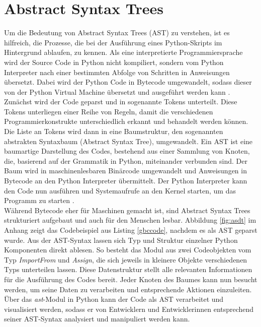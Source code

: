 \documentclass[german,bachelor]{swsLeipzig}
\begin{document}
\section{Abstract Syntax Trees}
Um die Bedeutung von Abstract Syntax Trees (AST) zu verstehen, ist es hilfreich, die Prozesse, die
bei der Ausführung eines Python-Skripts im Hintergrund ablaufen, zu kennen.
Als eine interpretierte Programmiersprache wird der Source Code in Python nicht kompiliert, sondern vom
Python Interpreter nach einer bestimmten Abfolge von Schritten in Anweisungen übersetzt.
Dabei wird der Python Code in Bytecode umgewandelt, sodass dieser von der Python Virtual Machine
übersetzt und ausgeführt werden kann \cite[]{aycock1998compiling}. \\
\indent Zunächst wird der Code geparst und in sogenannte Tokens unterteilt.
Diese Tokens unterliegen einer Reihe von Regeln, damit die verschiedenen Programmierkonstrukte unterschiedlich erkannt
und behandelt werden können.
Die Liste an Tokens wird dann in eine Baumstruktur, den sogenannten abstrakten Syntaxbaum (Abstract Syntax Tree), umgewandelt.
Ein AST ist eine baumartige Darstellung des Codes, bestehend aus einer Sammlung von Knoten, die, basierend auf der Grammatik
in Python, miteinander verbunden sind.
Der Baum wird in maschinenlesbaren Binärcode umgewandelt und Anweisungen in Bytecode an den Python Interpreter übermittelt.
Der Python Interpreter kann den Code nun ausführen und Systemaufrufe an den Kernel starten, um das Programm zu starten \cite[]{aycock1998compiling}. \\

\noindent Während Bytecode eher für Maschinen gemacht ist, sind Abstract Syntax Trees strukturiert aufgebaut und auch für den Menschen lesbar.
Abbildung \ref{fig:asdt} im Anhang zeigt das Codebeispiel aus Listing \ref{gbccode}, nachdem es als AST geparst wurde.
Aus der AST-Syntax lassen sich Typ und Struktur einzelner Python Komponenten direkt ablesen.
So besteht das Modul aus zwei Codeobjekten vom Typ \textit{ImportFrom} und \textit{Assign}, die sich jeweils in kleinere
Objekte verschiedenen Typs unterteilen lassen.
Diese Datenstruktur stellt alle relevanten Informationen für die Ausführung des Codes bereit.
Jeder Knoten des Baumes kann nun besucht werden, um seine Daten zu verarbeiten und entsprechende Aktionen einzuleiten.
Über das \textit{ast}-Modul in Python kann der Code als AST verarbeitet und visualisiert werden, sodass er von
Entwicklern und Entwicklerinnen entsprechend seiner AST-Syntax analysiert und manipuliert werden kann.\\
\end{document}
